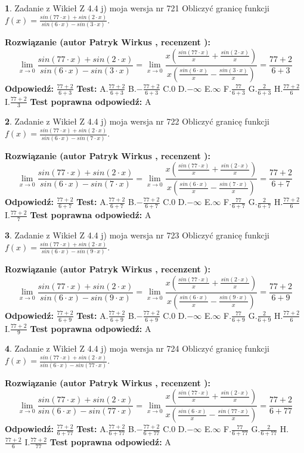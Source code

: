 \documentclass[12pt, a4paper]{article}
\theoremstyle{definition} %
\newtheorem{zad}{}
\newcommand{\zadStart}[1]{\begin{zad}#1\newline}
\newcommand{\zadStop}{\end{zad}}
\newcommand{\rozwStart}[2]{\noindent \textbf{Rozwiązanie (autor #1 , recenzent #2): }\newline}
\newcommand{\rozwStop}{\newline}
\newcommand{\odpStart}{\noindent \textbf{Odpowiedź:}\newline}
\newcommand{\odpStop}{\newline}
\newcommand{\testStart}{\noindent \textbf{Test:}\newline}
\newcommand{\testStop}{\newline}
\newcommand{\kluczStart}{\noindent \textbf{Test poprawna odpowiedź:}\newline}
\newcommand{\kluczStop}{\newline}
\begin{document}
\zadStart{Zadanie z Wikieł Z 4.4 j) moja wersja nr 721}
Obliczyć granicę funkcji $f(x)=\frac{sin(77\cdot x) +sin(2\cdot x)}{sin(6\cdot x) -sin(3\cdot x)}$.
\zadStop
\rozwStart{Patryk Wirkus}{}
$$\lim\limits_{x\to 0}\frac{sin(77\cdot x) +sin(2\cdot x)}{sin(6\cdot x) -sin(3\cdot x)}=\lim\limits_{x\to 0}\frac{x(\frac{sin(77\cdot x)}{x}+\frac{sin(2\cdot x)}{x})}{x(\frac{sin(6\cdot x)}{x}-\frac{sin(3\cdot x)}{x})}=\frac{77+2}{6+3}$$
\rozwStop
\odpStart
$\frac{77+2}{6+3}$
\odpStop
\testStart
A.$\frac{77+2}{6+3}$
B.$-\frac{77+2}{6+3}$
C.$0$
D.$-\infty$
E.$\infty$
F.$\frac{77}{6+3}$
G.$\frac{2}{6+3}$
H.$\frac{77+2}{6}$
I.$\frac{77+2}{3}$
\testStop
\kluczStart
A
\kluczStop



\zadStart{Zadanie z Wikieł Z 4.4 j) moja wersja nr 722}
Obliczyć granicę funkcji $f(x)=\frac{sin(77\cdot x) +sin(2\cdot x)}{sin(6\cdot x) -sin(7\cdot x)}$.
\zadStop
\rozwStart{Patryk Wirkus}{}
$$\lim\limits_{x\to 0}\frac{sin(77\cdot x) +sin(2\cdot x)}{sin(6\cdot x) -sin(7\cdot x)}=\lim\limits_{x\to 0}\frac{x(\frac{sin(77\cdot x)}{x}+\frac{sin(2\cdot x)}{x})}{x(\frac{sin(6\cdot x)}{x}-\frac{sin(7\cdot x)}{x})}=\frac{77+2}{6+7}$$
\rozwStop
\odpStart
$\frac{77+2}{6+7}$
\odpStop
\testStart
A.$\frac{77+2}{6+7}$
B.$-\frac{77+2}{6+7}$
C.$0$
D.$-\infty$
E.$\infty$
F.$\frac{77}{6+7}$
G.$\frac{2}{6+7}$
H.$\frac{77+2}{6}$
I.$\frac{77+2}{7}$
\testStop
\kluczStart
A
\kluczStop



\zadStart{Zadanie z Wikieł Z 4.4 j) moja wersja nr 723}
Obliczyć granicę funkcji $f(x)=\frac{sin(77\cdot x) +sin(2\cdot x)}{sin(6\cdot x) -sin(9\cdot x)}$.
\zadStop
\rozwStart{Patryk Wirkus}{}
$$\lim\limits_{x\to 0}\frac{sin(77\cdot x) +sin(2\cdot x)}{sin(6\cdot x) -sin(9\cdot x)}=\lim\limits_{x\to 0}\frac{x(\frac{sin(77\cdot x)}{x}+\frac{sin(2\cdot x)}{x})}{x(\frac{sin(6\cdot x)}{x}-\frac{sin(9\cdot x)}{x})}=\frac{77+2}{6+9}$$
\rozwStop
\odpStart
$\frac{77+2}{6+9}$
\odpStop
\testStart
A.$\frac{77+2}{6+9}$
B.$-\frac{77+2}{6+9}$
C.$0$
D.$-\infty$
E.$\infty$
F.$\frac{77}{6+9}$
G.$\frac{2}{6+9}$
H.$\frac{77+2}{6}$
I.$\frac{77+2}{9}$
\testStop
\kluczStart
A
\kluczStop



\zadStart{Zadanie z Wikieł Z 4.4 j) moja wersja nr 724}
Obliczyć granicę funkcji $f(x)=\frac{sin(77\cdot x) +sin(2\cdot x)}{sin(6\cdot x) -sin(77\cdot x)}$.
\zadStop
\rozwStart{Patryk Wirkus}{}
$$\lim\limits_{x\to 0}\frac{sin(77\cdot x) +sin(2\cdot x)}{sin(6\cdot x) -sin(77\cdot x)}=\lim\limits_{x\to 0}\frac{x(\frac{sin(77\cdot x)}{x}+\frac{sin(2\cdot x)}{x})}{x(\frac{sin(6\cdot x)}{x}-\frac{sin(77\cdot x)}{x})}=\frac{77+2}{6+77}$$
\rozwStop
\odpStart
$\frac{77+2}{6+77}$
\odpStop
\testStart
A.$\frac{77+2}{6+77}$
B.$-\frac{77+2}{6+77}$
C.$0$
D.$-\infty$
E.$\infty$
F.$\frac{77}{6+77}$
G.$\frac{2}{6+77}$
H.$\frac{77+2}{6}$
I.$\frac{77+2}{77}$
\testStop
\kluczStart
A
\kluczStop
\end{document}
